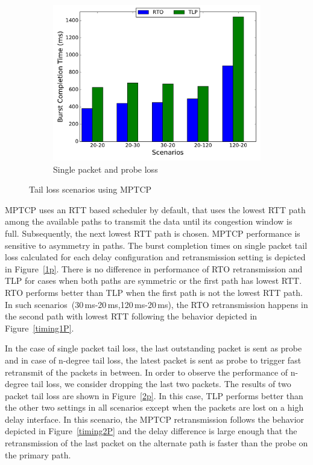 \documentclass[10pt,conference,compsoc]{IEEEtran}
\begin{document}
\begin{figure}[!tbp]
\begin{subfigure}[b]{0.32\textwidth}
\includegraphics[angle=0, width=\textwidth, natwidth=578.16,natheight=433.62]{plots/1PP.pdf}
\caption{Single packet and probe loss}\label{1pp}
 \end{subfigure}
 \caption{Tail loss scenarios using MPTCP}
\end{figure}

MPTCP uses an RTT based scheduler by default, that uses the lowest RTT path among the available paths to transmit
the data until its congestion window is full. Subsequently, the next lowest RTT path is chosen. MPTCP performance
is sensitive to asymmetry in paths. The burst completion times on single packet tail loss calculated for each delay 
configuration and retransmission setting is depicted in Figure~\ref{1p}. There is no difference in performance of RTO retransmission and TLP for 
cases when both paths are symmetric or the first path has lowest RTT. RTO performs better than TLP when the first path is not the lowest RTT path. In such
scenarios~(30\,ms-20\,ms,120\,ms-20\,ms), the RTO retransmission happens in the second path with lowest RTT following the behavior depicted
in Figure~\ref{timing1P}.






In the case of single packet tail loss, the last outstanding packet is sent as probe and in case of n-degree tail loss,
the latest packet is sent as probe to trigger fast retransmit of the packets in between. In order to observe
the performance of n-degree tail loss, we consider dropping the last two packets. 
The results of two packet tail loss are shown in Figure~\ref{2p}. In this case, TLP performs better than the other 
two settings in all scenarios except when the packets are lost on a high delay interface. In this scenario, the MPTCP retransmission follows the behavior depicted in Figure~\ref{timing2P} and the delay difference is large enough that the retransmission of the last packet on the alternate path is faster than the probe on the primary path. 
\end{document}
